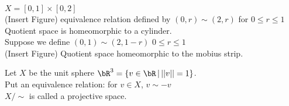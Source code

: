 \begin{example}
    $X = [0,1] \times [0,2]$ \\
    (Insert Figure) equivalence relation defined by $(0,r) \sim (2,r)$ for $0 \le r \le 1$ \\
    Quotient space is homeomorphic to a cylinder. \\
    Suppose we define $(0,1) \sim (2, 1-r)$ $0 \le r \le 1$ \\
    (Insert Figure) Quotient space homeomorphic to the mobius strip. 
\end{example}

\begin{example}
    Let $X$ be the unit sphere $\bR^3 = \{ v \in \bR \, | \, ||v||=1\}$. \\
    Put an equivalence relation: for $v \in X$, $v \sim - v$ \\
    $X/\sim$ is called a projective space.  
\end{example}